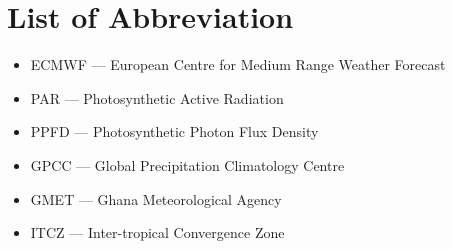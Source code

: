 \label{abbreviation}

\chapter*{List of Abbreviation}
\begin{itemize}
 \item ECMWF    --- European Centre for Medium Range Weather Forecast
 \item PAR      --- Photosynthetic Active Radiation
 \item PPFD     --- Photosynthetic Photon Flux Density
 \item GPCC     --- Global Precipitation Climatology Centre
 \item GMET     --- Ghana Meteorological Agency
 \item ITCZ     --- Inter-tropical Convergence Zone
\end{itemize}

